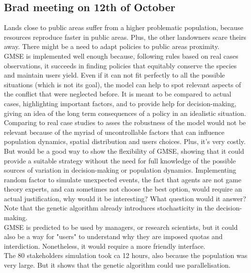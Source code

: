 \documentclass[12pt]{article}
\begin{document}
\subsection*{Brad meeting on 12th of October}
Lands close to public areas suffer from a higher problematic population, because resources reproduce faster in public areas. Plus, the other landowners scare theirs away. There might be a need to adapt policies to public areas proximity.\\
GMSE is implemented well enough because, following rules based on real cases observations, it succeeds in finding policies that equitably conserve the species and maintain users yield.
Even if it can not fit perfectly to all the possible situations (which is not its goal), the model can help to spot relevant aspects of the conflict that were neglected before.
It is meant to be compared to actual cases, highlighting important factors, and to provide help for decision-making, giving an idea of the long term consequences of a policy in an idealistic situation.\\
Comparing to real case studies to asses the robustness of the model would not be relevant because of the myriad of uncontrollable factors that can influence population dynamics, spatial distribution and users choices.
Plus, it's very costly.
But would be a good way to show the flexibility of GMSE, showing that it could provide a suitable strategy without the need for full knowledge of the possible sources of variation in decision-making or population dynamics.
Implementing random factor to simulate unexpected events, the fact that agents are not game theory experts, and can sometimes not choose the best option, would require an actual justification, why would it be interesting?
What question would it answer?
Note that the genetic algorithm already introduces stochasticity in the decision-making.\\
GMSE is predicted to be used by managers, or research scientists, but it could also be a way for "users" to understand why they are imposed quotas and interdiction.
Nonetheless, it would require a more friendly interface.\\
The 80 stakeholders simulation took ca 12 hours, also because the population was very large.
But it shows that the genetic algorithm could use parallelisation.\\
\end{document}
